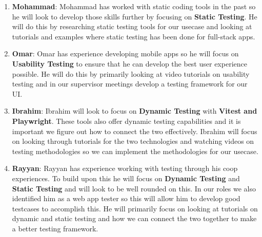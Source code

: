 \documentclass[12pt, titlepage]{article}
\begin{document}
\begin{enumerate}
\begin{enumerate}
    \item \textbf{Mohammad}: Mohammad has worked with static coding tools in the past so he will look to develop those skills further by focusing on \textbf{Static Testing}. He will do this by researching static testing tools for our usecase and looking at tutorials and examples where static testing has been done for full-stack apps.

    \item \textbf{Omar}: Omar has experience developing mobile apps so he will focus on \textbf{Usability Testing} to ensure that he can develop the best user experience possible. He will do this by primarily looking at video tutorials on usability testing and in our supervisor meetings develop a testing framework for our UI.

    \item \textbf{Ibrahim}: Ibrahim will look to focus on \textbf{Dynamic Testing} with \textbf{Vitest and Playwright}. These tools also offer dynamic testing capabilities and it is important we figure out how to connect the two effectively. Ibrahim will focus on looking through tutorials for the two technologies and watching videos on testing methodologies so we can implement the methodologies for our usecase.

    \item \textbf{Rayyan}: Rayyan has experience working with testing through his coop experiences. To build upon this he will focus on \textbf{Dynamic Testing} and \textbf{Static Testing} and will look to be well rounded on this. In our roles we also identified him as a web app tester so this will allow him to develop good testcases to accomplish this. He will primarily focus on looking at tutorials on dynamic and static testing and how we can connect the two together to make a better testing framework.

\end{enumerate}
\end{enumerate}
\end{document}
